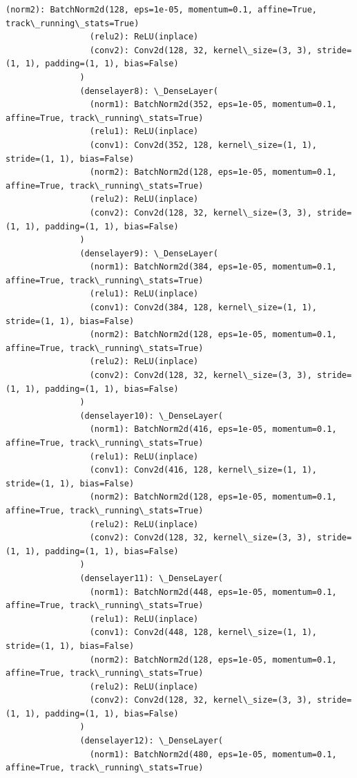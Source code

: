 \documentclass[11pt]{article}
\begin{document}
\begin{Verbatim}[commandchars=\\\{\}]
                 (norm2): BatchNorm2d(128, eps=1e-05, momentum=0.1, affine=True, track\_running\_stats=True)
                 (relu2): ReLU(inplace)
                 (conv2): Conv2d(128, 32, kernel\_size=(3, 3), stride=(1, 1), padding=(1, 1), bias=False)
               )
               (denselayer8): \_DenseLayer(
                 (norm1): BatchNorm2d(352, eps=1e-05, momentum=0.1, affine=True, track\_running\_stats=True)
                 (relu1): ReLU(inplace)
                 (conv1): Conv2d(352, 128, kernel\_size=(1, 1), stride=(1, 1), bias=False)
                 (norm2): BatchNorm2d(128, eps=1e-05, momentum=0.1, affine=True, track\_running\_stats=True)
                 (relu2): ReLU(inplace)
                 (conv2): Conv2d(128, 32, kernel\_size=(3, 3), stride=(1, 1), padding=(1, 1), bias=False)
               )
               (denselayer9): \_DenseLayer(
                 (norm1): BatchNorm2d(384, eps=1e-05, momentum=0.1, affine=True, track\_running\_stats=True)
                 (relu1): ReLU(inplace)
                 (conv1): Conv2d(384, 128, kernel\_size=(1, 1), stride=(1, 1), bias=False)
                 (norm2): BatchNorm2d(128, eps=1e-05, momentum=0.1, affine=True, track\_running\_stats=True)
                 (relu2): ReLU(inplace)
                 (conv2): Conv2d(128, 32, kernel\_size=(3, 3), stride=(1, 1), padding=(1, 1), bias=False)
               )
               (denselayer10): \_DenseLayer(
                 (norm1): BatchNorm2d(416, eps=1e-05, momentum=0.1, affine=True, track\_running\_stats=True)
                 (relu1): ReLU(inplace)
                 (conv1): Conv2d(416, 128, kernel\_size=(1, 1), stride=(1, 1), bias=False)
                 (norm2): BatchNorm2d(128, eps=1e-05, momentum=0.1, affine=True, track\_running\_stats=True)
                 (relu2): ReLU(inplace)
                 (conv2): Conv2d(128, 32, kernel\_size=(3, 3), stride=(1, 1), padding=(1, 1), bias=False)
               )
               (denselayer11): \_DenseLayer(
                 (norm1): BatchNorm2d(448, eps=1e-05, momentum=0.1, affine=True, track\_running\_stats=True)
                 (relu1): ReLU(inplace)
                 (conv1): Conv2d(448, 128, kernel\_size=(1, 1), stride=(1, 1), bias=False)
                 (norm2): BatchNorm2d(128, eps=1e-05, momentum=0.1, affine=True, track\_running\_stats=True)
                 (relu2): ReLU(inplace)
                 (conv2): Conv2d(128, 32, kernel\_size=(3, 3), stride=(1, 1), padding=(1, 1), bias=False)
               )
               (denselayer12): \_DenseLayer(
                 (norm1): BatchNorm2d(480, eps=1e-05, momentum=0.1, affine=True, track\_running\_stats=True)

\end{Verbatim}
\end{document}
